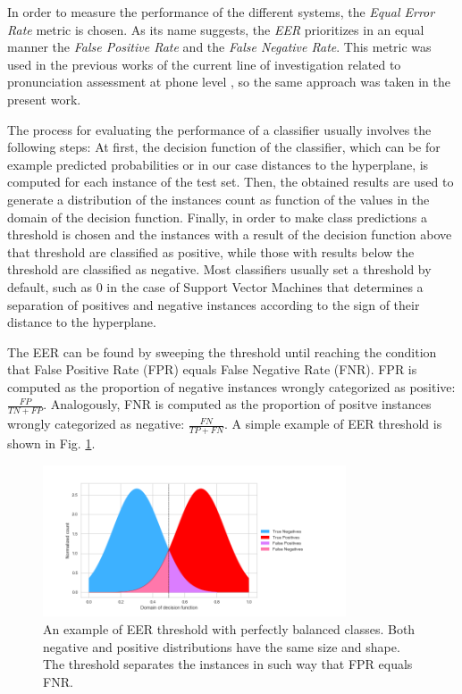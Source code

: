 In order to measure the performance of the different systems, the \textit{Equal Error Rate} metric
is chosen. As its name suggests, the \textit{EER} prioritizes in an equal manner the
\textit{False Positive Rate} and the \textit{False Negative Rate}.
This metric was used
in the previous works of the current line of investigation related to pronunciation assessment
at phone level \cite{detection_phone_level_mispronunciation_learning, main}, so the same approach
was taken in the present work.

The process for evaluating the performance of a classifier usually involves the following steps:
At first, the decision function of the classifier, which can be for example predicted probabilities
or in our case distances to the hyperplane, is computed for each instance of the test set.
Then, the obtained results are used to generate
a distribution of the instances count as function of the values
in the domain of the decision function. Finally,
in order to make class predictions a threshold is chosen and the instances with a result of the
decision function above that threshold are classified as positive, while
those with results below the threshold are classified as negative. Most classifiers
usually set a threshold by default, such as 0 in the case of Support Vector Machines that
determines a separation of
positives and negative instances according to the sign of their distance to the hyperplane.

The EER can be found by sweeping the threshold until reaching the condition that
False Positive Rate (FPR) equals False Negative Rate (FNR). FPR is computed as
the proportion of negative instances wrongly
categorized as positive: $\frac{FP}{TN+FP}$.
Analogously, FNR is computed as the proportion of positve
instances wrongly categorized as negative:
$\frac{FN}{TP+FN}$. A simple example of EER threshold is
shown in Fig. \ref{fig:eer}.

\begin{figure}[H]
  \centering
  \includegraphics[width=0.8\textwidth]{files/figures/method/eer}
  \caption{An example of EER threshold with perfectly balanced classes. Both negative and positive distributions have the same size and shape.
  The threshold separates the instances in such way that FPR equals FNR.}
  \label{fig:eer}
\end{figure}
